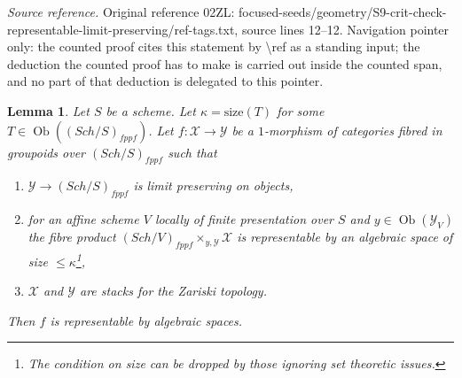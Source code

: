 \documentclass{stacks-project}
\theoremstyle{plain}
\newtheorem{lemma}[subsection]{Lemma}
\theoremstyle{definition}
\theoremstyle{remark}
\numberwithin{equation}{subsection}
\def\Sch{\mathit{Sch}}
\def\Ob{\mathop{\mathrm{Ob}}\nolimits}
\begin{document}
\noindent\textit{Source reference.} Original reference 02ZL: focused-seeds/geometry/S9-crit-check-representable-limit-preserving/ref-tags.txt, source lines 12--12. Navigation pointer only: the counted proof cites this statement by \textbackslash{}ref as a standing input; the deduction the counted proof has to make is carried out inside the counted span, and no part of that deduction is delegated to this pointer.\par\medskip
\begin{lemma}
\label{lemma-check-representable-limit-preserving}
Let $S$ be a scheme.
Let $\kappa = \text{size}(T)$ for some $T \in \Ob((\Sch/S)_{fppf})$.
Let $f : \mathcal{X} \to \mathcal{Y}$ be a $1$-morphism
of categories fibred in groupoids over $(\Sch/S)_{fppf}$
such that
\begin{enumerate}
\item $\mathcal{Y} \to (\Sch/S)_{fppf}$ is limit preserving on objects,
\item for an affine scheme $V$ locally of finite presentation over $S$ and
$y \in \Ob(\mathcal{Y}_V)$ the fibre product
$(\Sch/V)_{fppf} \times_{y, \mathcal{Y}} \mathcal{X}$ is representable
by an algebraic space of size $\leq \kappa$\footnote{The condition on
size can be dropped by those ignoring set theoretic issues.},
\item $\mathcal{X}$ and $\mathcal{Y}$ are stacks for the Zariski topology.
\end{enumerate}
Then $f$ is representable by algebraic spaces.
\end{lemma}
\end{document}
